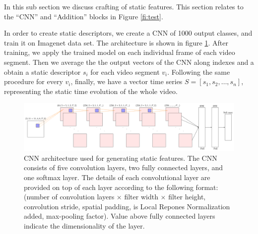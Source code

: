 In this sub section we discuss crafting of static features. This section relates to
the ``CNN'' and ``Addition'' blocks in Figure \ref{fi:test}.

In order to create static descriptors, we create a CNN of 1000 output classes, and train it on Imagenet data set. The architecture is shown in figure \ref{fi:cnn}.
After training, we apply the trained model on each individual frame of each video segment. Then we average the the output vectors of the CNN
along indexes and a obtain a static descriptor $s_{i}$ for each video segment $v_{i}$. Following the same
procedure for every $v_{i}$, finally, we have a vector time series
$S =[s_{1}, s_{2}, \dots, s_{n}]$, representing the static time evolution of the whole video.

\begin{figure}
  \centering
  \includegraphics[scale=0.5]{./figures/nw.pdf}
  \caption{CNN architecture used for generating static features. The CNN consists of five convolution layers,
  two fully connected layers, and one softmax layer. The details of each convolutional layer are provided on top of each layer
  according to the following format:(number of convolution layers $\times$ filter width $\times$ filter height, convolution stride,
  spatial padding, is Local Repones Normalization added, max-pooling factor). Value above fully connected layers indicate the dimensionality of the layer.}
\label{fi:cnn}
\end{figure} 